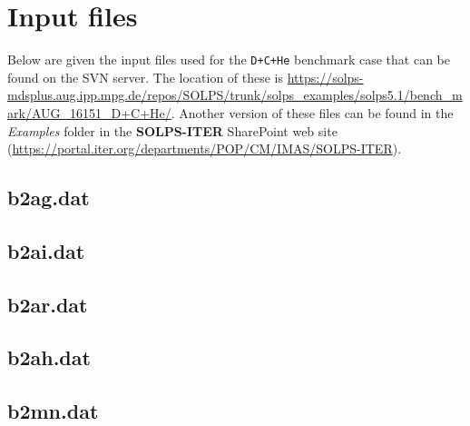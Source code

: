 \documentclass[a4paper,10pt]{report}
\newcommand\SOLPSITER{{\bf SOLPS-ITER} }
\begin{document}

\section{Input files}

Below are given the input files used for the {\tt D+C+He} benchmark
case that can be found on the SVN server. The location of these is
\href{https://solps-mdsplus.aug.ipp.mpg.de/repos/SOLPS/trunk/solps\_examples/solps5.1/bench\_mark/AUG\_16151\_D+C+He/}{https://solps-mdsplus.aug.ipp.mpg.de/repos/SOLPS/trunk/solps\_examples/solps5.1/bench\_mark/AUG\_16151\_D+C+He/}. Another version of
these files can be found in the {\em Examples} folder in the \SOLPSITER SharePoint
web site
(\href{https://portal.iter.org/departments/POP/CM/IMAS/SOLPS-ITER}{https://portal.iter.org/departments/POP/CM/IMAS/SOLPS-ITER}).

\subsection{b2ag.dat}

\subsection{b2ai.dat}

\subsection{b2ar.dat}

\subsection{b2ah.dat}

\subsection{b2mn.dat}
\end{document}
